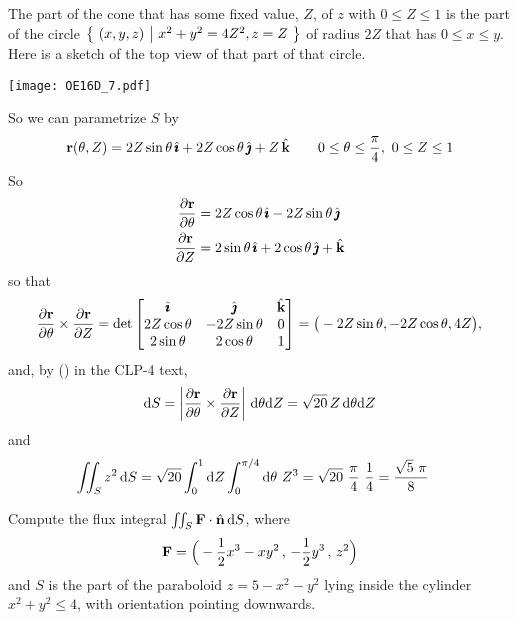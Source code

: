 \begin{solution} 
The part of the cone that has some fixed value, $Z$, of $z$ with $0\le Z\le 1$
is the part of the circle $\big\{ \ (x,y,z)\ \big|\ x^2+y^2=4Z^2, z=Z\ \big\}$ of radius $2Z$
that has $0\le x\le y$. Here is a sketch of the top view of that part of that 
circle.
\begin{center}
     \texttt{[image: OE16D\_7.pdf]}
\end{center}
So we can parametrize $S$ by
\begin{equation*}
\mathbf{r}(\theta,Z) = 2Z\sin\theta\,\hat{\pmb{\imath}} +2Z\cos\theta\,\hat{\pmb{\jmath}} + Z\,\hat{\mathbf{k}}\qquad
0\le\theta\le\frac{\pi}{4},\ 0\le Z\le 1
\end{equation*}
So
\begin{align*}
\frac{\partial\mathbf{r}}{\partial\theta}
&= 2Z\cos\theta\,\hat{\pmb{\imath}} -2Z\sin\theta\,\hat{\pmb{\jmath}}  \\
\frac{\partial\mathbf{r}}{\partial Z}
&= 2\sin\theta\,\hat{\pmb{\imath}} +2\cos\theta\,\hat{\pmb{\jmath}} + \hat{\mathbf{k}}
\end{align*}
so that
\begin{equation*}
\frac{\partial\mathbf{r}}{\partial\theta}\times\frac{\partial\mathbf{r}}{\partial Z}
= \det\left[\begin{matrix} \hat{\pmb{\imath}} & \hat{\pmb{\jmath}} & \hat{\mathbf{k}} \\
2Z\cos\theta & -2Z\sin\theta & 0 \\
2\sin\theta & 2\cos\theta & 1\end{matrix}\right]
= \big(-2Z\sin\theta, -2Z\cos\theta, 4Z\big),
\end{equation*}
and, by () in the CLP-4 text,
\begin{align*}
\mathrm{d}S = \left|\frac{\partial\mathbf{r}}{\partial\theta}\times
            \frac{\partial\mathbf{r}}{\partial Z}\right|\,\mathrm{d}\theta\mathrm{d}Z
= \sqrt{20}\,Z\,\mathrm{d}\theta\mathrm{d}Z
\end{align*}
and
\begin{align*}
\iint_S z^2\,\mathrm{d}S
&=\sqrt{20} \int_0^1\mathrm{d}Z\int_0^{\pi/4}\mathrm{d}\theta\ Z^3
=\sqrt{20}\ \frac{\pi}{4}\ \frac{1}{4}
=\frac{\sqrt{5}\ \pi}{8}
\end{align*}
\end{solution}

\begin{question}[M317 2017A] %
Compute the flux integral $\iint_S \mathbf{F}\cdot\hat{\mathbf{n}}\,\mathrm{d}S$, where
\begin{equation*}
\mathbf{F} = \Big(-\frac{1}{2}x^3 - xy^2 \,,\, -\frac{1}{2} y^3 \,,\, z^2\Big)
\end{equation*}
and $S$ is the part of the paraboloid $z = 5 - x^2 - y^2$ 
lying inside the cylinder $x^2 + y^2 \le 4$,
with orientation pointing downwards.
\end{question}

